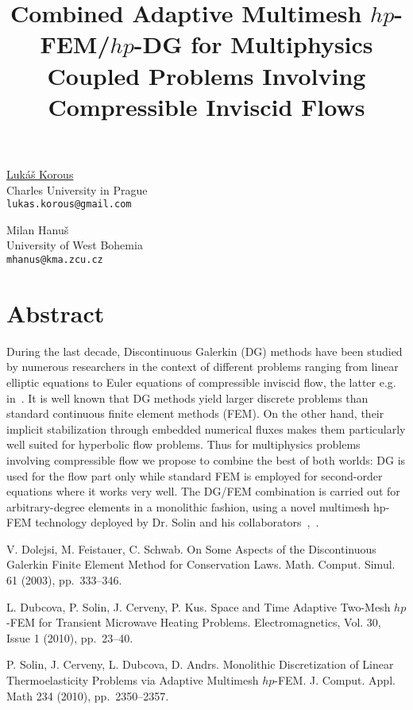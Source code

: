 \title{Combined Adaptive Multimesh $hp$-FEM/$hp$-DG for Multiphysics Coupled Problems Involving Compressible Inviscid Flows}
\author{} \institute{}
\maketitle

\begin{center}
{\large \underline{Luk\'a\v s Korous}}\\
Charles University in Prague\\
{\tt lukas.korous@gmail.com}\\
\vspace{4mm}

{\large Milan Hanu\v s}\\
University of West Bohemia\\
{\tt mhanus@kma.zcu.cz}
\end{center}

\section*{Abstract}
During the last decade, Discontinuous Galerkin (DG) methods have been studied by numerous researchers in the context of different problems ranging from linear elliptic equations to Euler equations of compressible inviscid flow, the latter e.g. in~\cite{korous1}. It is well known that DG methods yield larger discrete problems than standard continuous finite element methods (FEM). On the other hand, their implicit stabilization through embedded numerical fluxes makes them particularly well
suited for hyperbolic flow problems. Thus for multiphysics problems involving compressible flow we propose to combine the best of both worlds: DG is used for the flow part only while standard FEM is employed for second-order equations where it works very well. The DG/FEM combination is carried out for arbitrary-degree elements in a monolithic fashion, using a novel multimesh hp-FEM technology deployed by Dr. Solin and his collaborators~\cite{korous2},~\cite{korous3}.


\begin{thebibliography}{10}
{\sc V. Dolejsi, M. Feistauer, C. Schwab}. {On Some Aspects of the Discontinuous Galerkin Finite Element Method for Conservation Laws}. Math. Comput. Simul. 61 (2003), pp.~333--346.

{\sc L. Dubcova, P. Solin, J. Cerveny, P. Kus}. {Space and Time Adaptive Two-Mesh $hp$-FEM for Transient Microwave Heating Problems}. Electromagnetics, Vol. 30, Issue 1 (2010), pp.~23--40.

{\sc P. Solin, J. Cerveny, L. Dubcova, D. Andrs}. {Monolithic Discretization of Linear Thermoelasticity Problems via Adaptive Multimesh $hp$-FEM}. J. Comput. Appl. Math 234 (2010), pp.~2350--2357.
\end{thebibliography}
